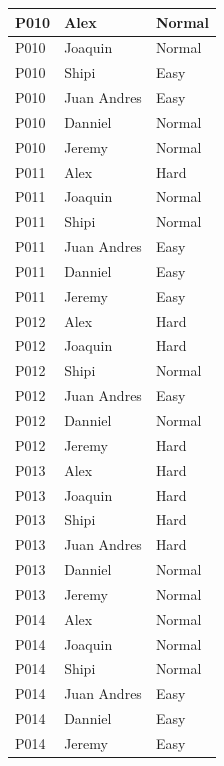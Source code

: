 \begin{longtable}{
    |
    >{\centering\arraybackslash}p{4.5cm}|
    >{\centering\arraybackslash}p{4.5cm}|
    >{\centering\arraybackslash}p{4.5cm}|
}
    P010 & Alex        & Normal \\ \hline
    P010 & Joaquin     & Normal \\ \hline
    P010 & Shipi       & Easy \\ \hline
    P010 & Juan Andres & Easy \\ \hline
    P010 & Danniel     & Normal \\ \hline
    P010 & Jeremy      & Normal \\ \hline

    P011 & Alex        & Hard \\ \hline
    P011 & Joaquin     & Normal \\ \hline
    P011 & Shipi       & Normal \\ \hline
    P011 & Juan Andres & Easy \\ \hline
    P011 & Danniel     & Easy \\ \hline
    P011 & Jeremy      & Easy \\ \hline

    P012 & Alex        & Hard \\ \hline
    P012 & Joaquin     & Hard \\ \hline
    P012 & Shipi       & Normal \\ \hline
    P012 & Juan Andres & Easy \\ \hline
    P012 & Danniel     & Normal \\ \hline
    P012 & Jeremy      & Hard \\ \hline

    P013 & Alex        & Hard \\ \hline
    P013 & Joaquin     & Hard \\ \hline
    P013 & Shipi       & Hard \\ \hline
    P013 & Juan Andres & Hard \\ \hline
    P013 & Danniel     & Normal \\ \hline
    P013 & Jeremy      & Normal \\ \hline

    P014 & Alex        & Normal \\ \hline
    P014 & Joaquin     & Normal \\ \hline
    P014 & Shipi       & Normal \\ \hline
    P014 & Juan Andres & Easy \\ \hline
    P014 & Danniel     & Easy \\ \hline
    P014 & Jeremy      & Easy \\ \hline


\end{longtable}
